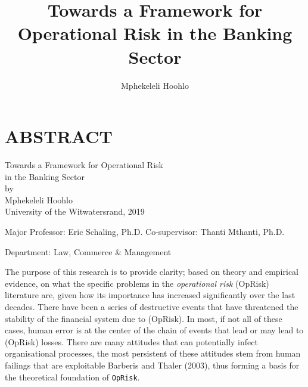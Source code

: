 \documentclass[]{DissertateUSU}
\title{Towards a Framework for Operational Risk in the Banking Sector}
\author{Mphekeleli Hoohlo}
\date{}
\begin{document}
\maketitle

 \pagestyle{empty} \copyrightpage

\newpage

\pagestyle{fancy}  \fancyhead[R]{\thepage}
\fancyfoot[C]{} \chapter*{ABSTRACT}

\doublespacing

\begin{center}
Towards a Framework for Operational Risk \\ 
in the Banking Sector \\
\vspace{12pt}
by \\
\vspace{12pt}
Mphekeleli Hoohlo \\
University of the Witwatersrand, 2019
\end{center}

\vspace{12pt}

\singlespacing
\noindent Major Professor: Eric Schaling, Ph.D. \noindent Co-supervisor:
Thanti Mthanti, Ph.D.

\noindent Department: Law, Commerce \& Management

\vspace{12pt}

\doublespacing

The purpose of this research is to provide clarity; based on theory and
empirical evidence, on what the specific problems in the
\emph{operational risk} (OpRisk) literature are, given how its
importance has increased significantly over the last decades. There have
been a series of destructive events that have threatened the stability
of the financial system due to (OpRisk). In most, if not all of these
cases, human error is at the center of the chain of events that lead or
may lead to (OpRisk) losses. There are many attitudes that can
potentially infect organisational processes, the most persistent of
these attitudes stem from human failings that are exploitable Barberis
and Thaler (2003), thus forming a basis for the theoretical foundation
of \texttt{OpRisk}.
\end{document}
